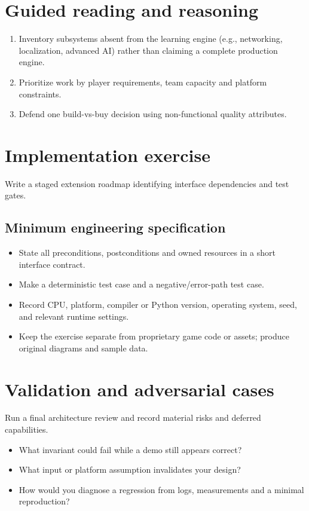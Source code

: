 \documentclass[11pt,letterpaper]{article}
\begin{document}
\section{Guided reading and reasoning}
\begin{enumerate}
\item Inventory subsystems absent from the learning engine (e.g., networking, localization, advanced AI) rather than claiming a complete production engine.
\item Prioritize work by player requirements, team capacity and platform constraints.
\item Defend one build-vs-buy decision using non-functional quality attributes.
\end{enumerate}
\section{Implementation exercise}
Write a staged extension roadmap identifying interface dependencies and test gates.

\subsection{Minimum engineering specification}
\begin{itemize}
\item State all preconditions, postconditions and owned resources in a short interface contract.
\item Make a deterministic test case and a negative/error-path test case.
\item Record CPU, platform, compiler or Python version, operating system, seed, and relevant runtime settings.
\item Keep the exercise separate from proprietary game code or assets; produce original diagrams and sample data.
\end{itemize}
\section{Validation and adversarial cases}
Run a final architecture review and record material risks and deferred capabilities.

\begin{itemize}
\item What invariant could fail while a demo still appears correct?
\item What input or platform assumption invalidates your design?
\item How would you diagnose a regression from logs, measurements and a minimal reproduction?
\end{itemize}
\end{document}
